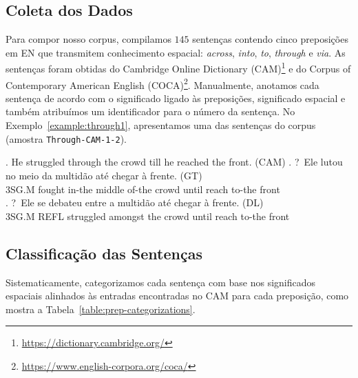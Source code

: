 \documentclass[a4paper, twocolumn, 11pt, twoside]{article}
\begin{document}
\subsection{Coleta dos Dados}

Para compor nosso corpus, compilamos $145$ sentenças contendo cinco preposições em EN que transmitem conhecimento espacial: 
\textit{across}, \textit{into}, \textit{to}, \textit{through} e \textit{via}. As sentenças foram obtidas do Cambridge Online Dictionary (CAM)\footnote{\url{https://dictionary.cambridge.org/}} e 
do Corpus of Contemporary American English (COCA)\footnote{\url{https://www.english-corpora.org/coca/}}. 
Manualmente, anotamos cada sentença de acordo com o significado ligado às preposições, significado espacial e também atribuímos um identificador para o número da sentença.
No Exemplo~\ref{example:through1}, apresentamos uma das sentenças do corpus (amostra \texttt{Through-CAM-1-2}).

\footnotesize
\ex. He struggled through the crowd till he reached the front. (CAM) \label{example:through1} 
\ag. ?~Ele lutou no meio da multidão até chegar à frente. (GT) \\ 
3SG.M fought in-the middle of-the crowd until reach to-the front \\ 
\medskip
\bg. ?~Ele se debateu entre a multidão até chegar à frente. (DL) \\ 
3SG.M REFL struggled amongst the crowd until reach to-the front \\ 
\par
\normalsize

\subsection{Classificação das Sentenças}


Sistematicamente, categorizamos cada sentença com base nos significados espaciais alinhados às entradas encontradas no CAM para cada preposição, 
como mostra a Tabela~\ref{table:prep-categorizations}.
\end{document}
